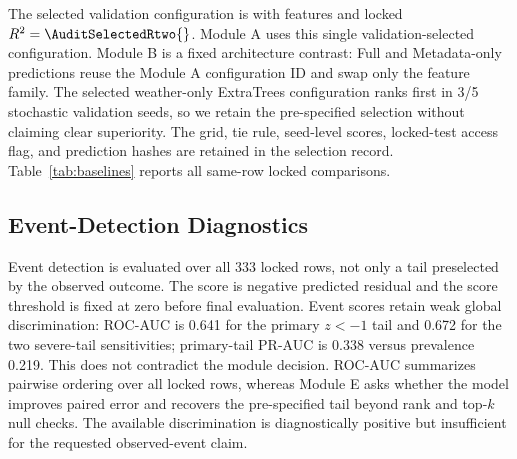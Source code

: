 \documentclass[conference]{IEEEtran}
\begin{document}
The selected validation configuration is \AuditSelectedModel{} with
\AuditSelectedFamily{} features and locked $R^2=\AuditSelectedRtwo{}$. Module A
uses this single validation-selected configuration. Module B is a fixed
architecture contrast: Full and Metadata-only predictions reuse the Module A
configuration ID and swap only the feature family. The selected weather-only
ExtraTrees configuration ranks first in 3/5 stochastic validation seeds, so we
retain the pre-specified selection without claiming clear superiority. The grid,
tie rule, seed-level scores, locked-test access flag, and prediction hashes are
retained in the selection record. Table~\ref{tab:baselines} reports all same-row
locked comparisons.

\begin{table}[t]
\centering
\caption{Locked 2016--2025 same-task audit. Learned-model predictions are seed
aggregated. $\Delta$RMSE is model minus zero-residual RMSE with paired 95\%
year-block intervals; RMSE is t ha$^{-1}$. The Module B contrast is computed
directly as Full-minus-Metadata; in this panel it matches Full-minus-zero
because Metadata-only predictions coincide with the zero-residual vector to
floating-point precision.}
\label{tab:baselines}
\scriptsize
\resizebox{\textwidth}{!}{}
\end{table}

\subsection{Event-Detection Diagnostics}
Event detection is evaluated over all 333 locked rows, not only a tail preselected
by the observed outcome. The score is negative predicted residual and the score
threshold is fixed at zero before final evaluation. Event scores retain weak
global discrimination: ROC-AUC is 0.641 for the primary $z<-1$ tail and 0.672 for
the two severe-tail sensitivities; primary-tail PR-AUC is 0.338 versus prevalence
0.219. This does not contradict the module decision. ROC-AUC summarizes pairwise
ordering over all locked rows, whereas Module E asks whether the model improves
paired error and recovers the pre-specified tail beyond rank and top-$k$ null
checks. The available discrimination is diagnostically positive but insufficient
for the requested observed-event claim.
\end{document}

